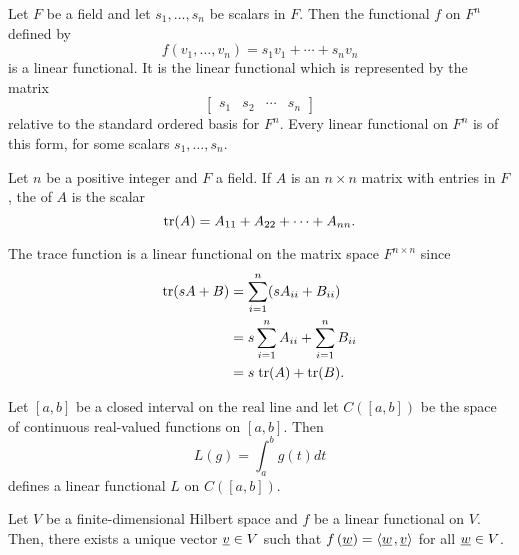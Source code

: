 \begin{example}
Let $F$ be a field and let $s_1, \ldots, s_n$ be scalars in $F$.
Then the functional $f$ on $F^n$ defined by
\begin{equation*}
f(v_1, \ldots, v_n) = s_1 v_1 + \cdots + s_n v_n
\end{equation*}
is a linear functional.
It is the linear functional which is represented by the matrix
\begin{equation*}
\begin{bmatrix} s_1 & s_2 & \cdots & s_n \end{bmatrix}
\end{equation*}
relative to the standard ordered basis for $F^n$.
Every linear functional on $F^n$ is of this form, for some scalars $s_1, \ldots, s_n$.
\end{example}

\begin{definition}
Let $n$ be a positive integer and $F$ a field.
If $A$ is an $n \times n$ matrix with entries in $F$, the  of $A$ is the scalar
\begin{equation*}
\mathrm{tr}(A) = A_{11} + A_{22} + \cdots + A_{nn}.
\end{equation*}
\end{definition}

\begin{example}
The trace function is a linear functional on the matrix space $F^{n \times n}$ since
\begin{equation*}
\begin{split}
\mathrm{tr} ( sA + B) &= \sum_{i=1}^n (s A_{ii} + B_{ii}) \\
&= s \sum_{i=1}^n A_{ii} + \sum_{i=1}^n  B_{ii} \\
&= s \; \mathrm{tr}(A) + \mathrm{tr}(B) .
\end{split}
\end{equation*}
\end{example}

\begin{example}
Let $[a, b]$ be a closed interval on the real line and let $C([a,b])$ be the space of continuous real-valued functions on $[a,b]$.
Then
\begin{equation*}
L(g) = \int_a^b g(t) dt
\end{equation*}
defines a linear functional $L$ on $C([a,b])$.
\end{example}

\begin{theorem}[Riesz] \label{theorem:riesz_finite}
Let $V$ be a finite-dimensional Hilbert space and $f$ be a linear functional on $V$.
Then, there exists a unique vector $\underline{v} \in V$ such that $f \left( \underline{w} \right) = {\left\langle  \underline{w}  \mskip2mu ,  \underline{v}  \right\rangle}$ for all $\underline{w} \in V$.
\end{theorem}


